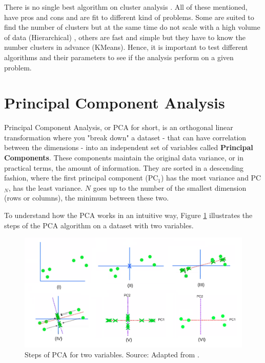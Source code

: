 There is no single best algorithm on cluster analysis \cite{james2013introduction}. All of these mentioned, have pros and cons and are fit to different kind of problems. Some are suited to find the number of clusters but at the same time do not scale with a high volume of data (Hierarchical) \cite{franti2006fast}, others are fast and simple but they have to know the number clusters in advance (KMeans). Hence, it is important to test different algorithms and their parameters to see if the analysis perform on a given problem.

\section{Principal Component Analysis}

Principal Component Analysis, or PCA for short, is an orthogonal linear transformation \cite{wikipedia_pca} where you "break down" a dataset - that can have correlation between the dimensions - into an independent set of variables called \textbf{Principal Components}. These components maintain the original data variance, or in practical terms, the amount of information. They are sorted in a descending fashion, where the first principal component (PC$_{1}$) has the most variance and PC$_{N}$, has the least variance. $N$ goes up to the number of the smallest dimension (rows or columns), the minimum between these two. 

To understand how the PCA works in an intuitive way, Figure \ref{fig:pca-steps} illustrates the steps of the PCA algorithm on a dataset with two variables.

\begin{figure}[h]
   \centering
   \includegraphics[width=\linewidth]{fig/ch2-pca-steps.png}
   \caption{Steps of PCA for two variables. Source: Adapted from \cite{pcastepsyoutube}.}
   \label{fig:pca-steps}
\end{figure}

